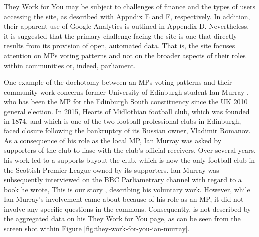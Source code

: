 They Work for You may be subject to challenges of finance and the types of users accessing the site, as described with Appndix E and F, respectively.
In addition, their apparent use of Google Analytics is outlined in Appendix D. 
Nevertheless, it is suggested that the primary challenge facing the site is one that directly results from its provision of open, automated data.
That is, the site focuses attention on MPs voting patterns and not on the broader aspects of their roles within communities or, indeed, parliament.

One example of the dochotomy between an MPs voting patterns and their community work concerns former University of Edinburgh student Ian Murray \cite{ian-murray}, who has been the MP for the Edinburgh South constituency since the UK 2010 general election. 
In 2015, Hearts of Midlothian football club, which was founded in 1874, and which is one of the two football professional clubs in Edinburgh, faced closure following the bankruptcy of its Russian owner, Vladimir Romanov.
As a consequence of his role as the local MP, Ian Murray was asked by supporters of the club to liase with the club's official receivers.
Over several years, his work led to a supports buyout the club, which is now the only football club in the Scottish Premier League owned by its supporters.
Ian Murray was subsequently interviewed \cite{ian-murray-bbc} on the BBC Parliametrary channel \cite{bbc-parliament} with regard to a book he wrote, This is our story \cite{ian-murray-this-is-our-story}, describing his voluntary work.
However, while Ian Murray’s involvement came about because of his role as an MP, it did not involve any specific questions in the commons.
Consequently, is not described by the aggregated data on his They Work for You page, as can be seen from the screen shot within Figure \ref{fig:they-work-for-you-ian-murray}.

